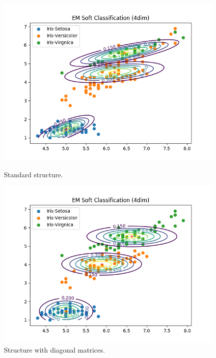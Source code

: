 \documentclass[a4paper]{article}
\begin{document}
\begin{enumerate}
\begin{figure}[htp]
\begin{minipage}{0.4\textwidth}
	\centering
  \includegraphics[scale=0.6]{plots/soft_classification_scenario2_cmpnt3.png}
  \caption{Standard structure.}
\end{minipage}
\hfill
\begin{minipage}{0.4\textwidth}
	\centering
  \includegraphics[scale=0.6]{plots/diagonal_4dim.png}
  \caption{Structure with diagonal matrices.}
\end{minipage}
\end{figure}

\end{enumerate}
\end{document}
